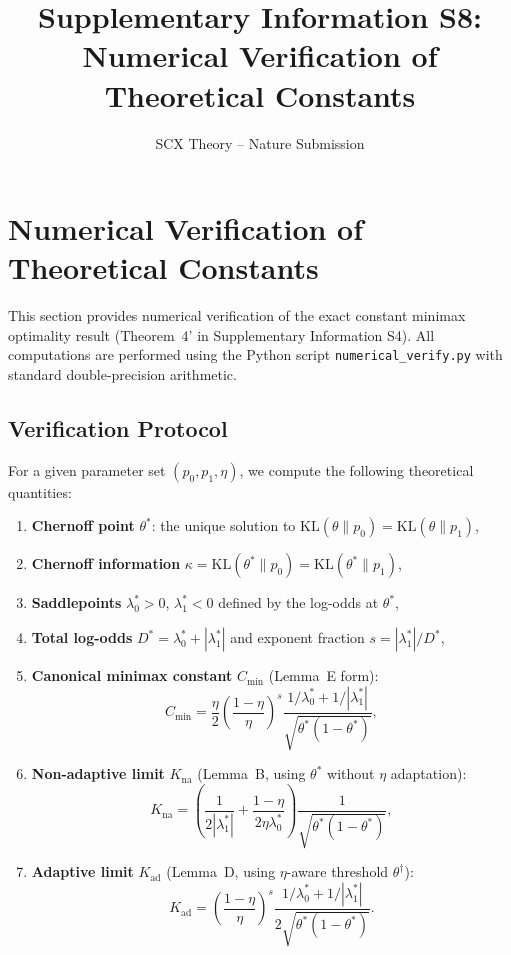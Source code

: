 \documentclass[article]{amsart}
\title{Supplementary Information S8: Numerical Verification of Theoretical Constants}
\author{SCX Theory -- Nature Submission}
\theoremstyle{definition}
\begin{document}
\maketitle

\section{Numerical Verification of Theoretical Constants}

This section provides numerical verification of the exact constant minimax optimality result (Theorem~4' in Supplementary Information S4). All computations are performed using the Python script \texttt{numerical\_verify.py} with standard double-precision arithmetic.

\subsection{Verification Protocol}

For a given parameter set $(p_0, p_1, \eta)$, we compute the following theoretical quantities:

\begin{enumerate}
    \item \textbf{Chernoff point} $\theta^*$: the unique solution to $\mathrm{KL}(\theta\|p_0) = \mathrm{KL}(\theta\|p_1)$,
    \item \textbf{Chernoff information} $\kappa = \mathrm{KL}(\theta^*\|p_0) = \mathrm{KL}(\theta^*\|p_1)$,
    \item \textbf{Saddlepoints} $\lambda_0^* > 0$, $\lambda_1^* < 0$ defined by the log-odds at $\theta^*$,
    \item \textbf{Total log-odds} $D^* = \lambda_0^* + |\lambda_1^*|$ and exponent fraction $s = |\lambda_1^*|/D^*$,
    \item \textbf{Canonical minimax constant} $C_{\min}$ (Lemma~E form):
        \begin{equation}
        C_{\min} = \frac{\eta}{2} \left(\frac{1-\eta}{\eta}\right)^{s}
        \frac{1/\lambda_0^* + 1/|\lambda_1^*|}{\sqrt{\theta^*(1-\theta^*)}},
        \end{equation}
    \item \textbf{Non-adaptive limit} $K_{\mathrm{na}}$ (Lemma~B, using $\theta^*$ without $\eta$ adaptation):
        \begin{equation}
        K_{\mathrm{na}} = \left(\frac{1}{2|\lambda_1^*|} + \frac{1-\eta}{2\eta\lambda_0^*}\right) \frac{1}{\sqrt{\theta^*(1-\theta^*)}},
        \end{equation}
    \item \textbf{Adaptive limit} $K_{\mathrm{ad}}$ (Lemma~D, using $\eta$-aware threshold $\theta^\dagger$):
        \begin{equation}
        K_{\mathrm{ad}} = \left(\frac{1-\eta}{\eta}\right)^{s} \frac{1/\lambda_0^* + 1/|\lambda_1^*|}{2\sqrt{\theta^*(1-\theta^*)}}.
        \end{equation}
\end{enumerate}
\end{document}
